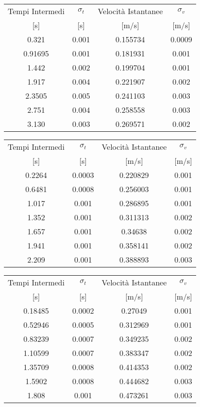 \documentclass[a4paper,11pt,oneside]{article}
\begin{document}
\begin{table}[h!]
\begin{tabular}{c|c|c|c}
    \toprule
    Tempi Intermedi & $\sigma_t$ & Velocità Istantanee & $\sigma_v$ \\
    {[}s{]} & [s] & [m/s] & [m/s]\\
    \midrule
    0.321 & 0.001 & 0.155734 & 0.0009 \\
    0.91695 & 0.001 & 0.181931 & 0.001 \\
    1.442 & 0.002 & 0.199704 & 0.001 \\
    1.917 & 0.004 & 0.221907 & 0.002 \\
    2.3505 & 0.005 & 0.241103 & 0.003 \\
    2.751 & 0.004 & 0.258558 & 0.003 \\
    3.130 & 0.003 & 0.269571 & 0.002 \\ 
    \bottomrule
\end{tabular}
\label{tab:15primi}
\end{table}

\begin{table}[h!]
\begin{tabular}{c|c|c|c}
    \toprule
    Tempi Intermedi & $\sigma_t$ & Velocità Istantanee & $\sigma_v$ \\
    {[}s{]} & [s] & [m/s] & [m/s]\\
    \midrule
    0.2264 & 0.0003 & 0.220829 & 0.001 \\
    0.6481 & 0.0008 & 0.256003 & 0.001 \\
    1.017 & 0.001 & 0.286895 & 0.001 \\
    1.352 & 0.001 & 0.311313 & 0.002 \\
    1.657 & 0.001 & 0.34638 & 0.002 \\
    1.941 & 0.001 & 0.358141 & 0.002 \\
    2.209 & 0.001 & 0.388893 & 0.003 \\
    \bottomrule
\end{tabular}
\label{tab:30primi}
\end{table}

\begin{table}[h!]
\begin{tabular}{c|c|c|c}
    \toprule
    Tempi Intermedi & $\sigma_t$ & Velocità Istantanee & $\sigma_v$ \\
    {[}s{]} & [s] & [m/s] & [m/s]\\
    \midrule
    0.18485 & 0.0002 & 0.27049 & 0.001 \\
    0.52946 & 0.0005 & 0.312969 & 0.001 \\ 
    0.83239 & 0.0007 & 0.349235 & 0.002 \\ 
    1.10599 & 0.0007 & 0.383347 & 0.002 \\ 
    1.35709 & 0.0008 & 0.414353 & 0.002 \\
    1.5902 & 0.0008 & 0.444682 & 0.003 \\
    1.808 & 0.001 & 0.473261 & 0.003 \\
    \bottomrule
\end{tabular}
\label{tab:45primi}
\end{table}
\end{document}
